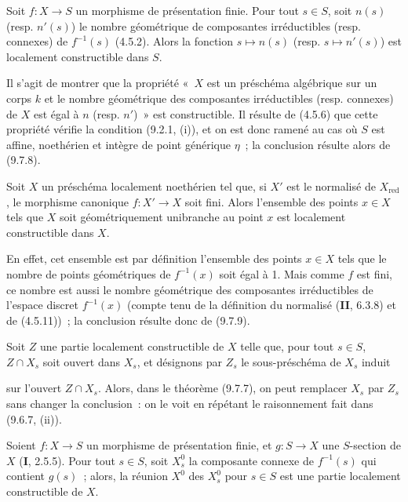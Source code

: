 \begin{corollary}[9.7.9]
\label{IV.9.7.9-fr}
Soit $f:X\to S$ un morphisme de présentation finie. Pour tout $s\in S$, soit
$n(s)$ (resp. $n'(s)$) le nombre géométrique de composantes irréductibles
(resp. connexes) de $f^{-1}(s)$ (4.5.2). Alors la fonction $s\mapsto n(s)$
(resp. $s\mapsto n'(s)$) est localement constructible dans $S$.
\end{corollary}

Il s'agit de montrer que la propriété «~$X$ est un préschéma algébrique sur un
corps $k$ et le nombre géométrique des composantes irréductibles (resp.
connexes) de $X$ est égal à $n$ (resp. $n'$)~» est constructible. Il résulte de
(4.5.6) que cette propriété vérifie la condition (9.2.1, (i)), et on est donc
ramené au cas où $S$ est affine, noethérien et intègre de point générique
$\eta$~; la conclusion résulte alors de (9.7.8).

\begin{corollary}[9.7.10]
\label{IV.9.7.10-fr}
Soit $X$ un préschéma localement noethérien tel que, si $X'$ est le normalisé de
$X_{\mathrm{red}}$, le morphisme canonique $f:X'\to X$ soit fini. Alors
l'ensemble des points $x\in X$ tels que $X$ soit géométriquement unibranche au
point $x$ est localement constructible dans $X$.
\end{corollary}

En effet, cet ensemble est par définition l'ensemble des points $x\in X$ tels
que le nombre de points géométriques de $f^{-1}(x)$ soit égal à 1. Mais comme
$f$ est fini, ce nombre est aussi le nombre géométrique des composantes
irréductibles de l'espace discret $f^{-1}(x)$ (compte tenu de la définition du
normalisé (\textbf{II}, 6.3.8) et de (4.5.11))~; la conclusion résulte donc de
(9.7.9).

\begin{remark}[9.7.11]
\label{IV.9.7.11-fr}
Soit $Z$ une partie localement constructible de $X$ telle que, pour tout
$s\in S$, $Z\cap X_s$ soit ouvert dans $X_s$, et désignons par $Z_s$ le
sous-préschéma de $X_s$ induit


sur l'ouvert $Z\cap X_s$. Alors, dans le théorème (9.7.7), on peut remplacer
$X_s$ par $Z_s$ sans changer la conclusion~: on le voit en répétant le
raisonnement fait dans (9.6.7, (ii)).
\end{remark}

\begin{proposition}[9.7.12]
\label{IV.9.7.12-fr}
Soient $f:X\to S$ un morphisme de présentation finie, et $g:S\to X$ une
$S$-section de $X$ (\textbf{I}, 2.5.5). Pour tout $s\in S$, soit $X_s^0$ la
composante connexe de $f^{-1}(s)$ qui contient $g(s)$~; alors, la réunion $X^0$
des $X_s^0$ pour $s\in S$ est une partie localement constructible de $X$.
\end{proposition}

